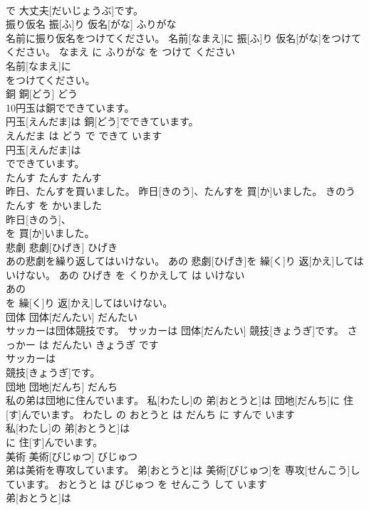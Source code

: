 \documentclass[8pt]{extreport}
\begin{document}
\begin{CJK}{UTF8}{min}
\\	で 大丈夫[だいじょうぶ]です。			
\\	振り仮名	振[ふ]り 仮名[がな]	ふりがな	
\\	名前に振り仮名をつけてください。	名前[なまえ]に 振[ふ]り 仮名[がな]をつけてください。	なまえ に ふりがな を つけて ください	
\\	名前[なまえ]に
\\	をつけてください。			
\\	銅	銅[どう]	どう	
\\	10円玉は銅でできています。	
\\	円玉[えんだま]は 銅[どう]でできています。	
\\	えんだま は どう で できて います	
\\	円玉[えんだま]は
\\	でできています。			
\\	たんす	たんす	たんす	
\\	昨日、たんすを買いました。	昨日[きのう]、たんすを 買[か]いました。	きのう たんす を かいました	
\\	昨日[きのう]、
\\	を 買[か]いました。			
\\	悲劇	悲劇[ひげき]	ひげき	
\\	あの悲劇を繰り返してはいけない。	あの 悲劇[ひげき]を 繰[く]り 返[かえ]してはいけない。	あの ひげき を くりかえして は いけない	
\\	あの
\\	を 繰[く]り 返[かえ]してはいけない。			
\\	団体	団体[だんたい]	だんたい	
\\	サッカーは団体競技です。	サッカーは 団体[だんたい] 競技[きょうぎ]です。	さっかー は だんたい きょうぎ です	
\\	サッカーは
\\	競技[きょうぎ]です。			
\\	団地	団地[だんち]	だんち	
\\	私の弟は団地に住んでいます。	私[わたし]の 弟[おとうと]は 団地[だんち]に 住[す]んでいます。	わたし の おとうと は だんち に すんで います	
\\	私[わたし]の 弟[おとうと]は
\\	に 住[す]んでいます。			
\\	美術	美術[びじゅつ]	びじゅつ	
\\	弟は美術を専攻しています。	弟[おとうと]は 美術[びじゅつ]を 専攻[せんこう]しています。	おとうと は びじゅつ を せんこう して います	
\\	弟[おとうと]は

\end{CJK}
\end{document}
